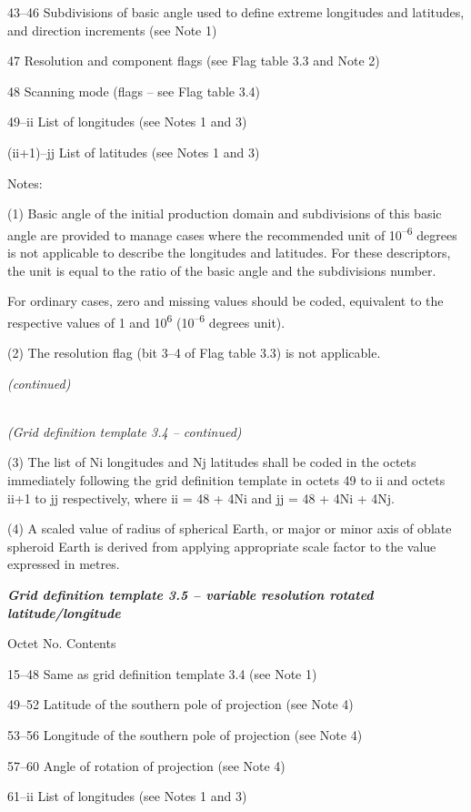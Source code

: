 43--46 Subdivisions of basic angle used to define extreme longitudes and latitudes, and direction increments (see Note 1)

47 Resolution and component flags (see Flag table 3.3 and Note 2)

48 Scanning mode (flags -- see Flag table 3.4)

49--ii List of longitudes (see Notes 1 and 3)

(ii+1)--jj List of latitudes (see Notes 1 and 3)

Notes:

(1) Basic angle of the initial production domain and subdivisions of this basic angle are provided to manage cases where the recommended unit of 10\textsuperscript{--6} degrees is not applicable to describe the longitudes and latitudes. For these descriptors, the unit is equal to the ratio of the basic angle and the subdivisions number.

For ordinary cases, zero and missing values should be coded, equivalent to the respective values of 1 and 10\textsuperscript{6} (10\textsuperscript{--6} degrees unit).

(2) The resolution flag (bit 3--4 of Flag table 3.3) is not applicable.

\emph{(continued)}

\emph{\\
(Grid definition template 3.4 -- continued)}

(3) The list of Ni longitudes and Nj latitudes shall be coded in the octets immediately following the grid definition template in octets 49 to ii and octets ii+1 to jj respectively, where ii = 48 + 4Ni and jj = 48 + 4Ni + 4Nj.

(4) A scaled value of radius of spherical Earth, or major or minor axis of oblate spheroid Earth is derived from applying appropriate scale factor to the value expressed in metres.

\emph{\textbf{Grid definition template 3.5 -- variable resolution rotated latitude/longitude}}

Octet No. Contents

15--48 Same as grid definition template 3.4 (see Note 1)

49--52 Latitude of the southern pole of projection (see Note 4)

53--56 Longitude of the southern pole of projection (see Note 4)

57--60 Angle of rotation of projection (see Note 4)

61--ii List of longitudes (see Notes 1 and 3)

